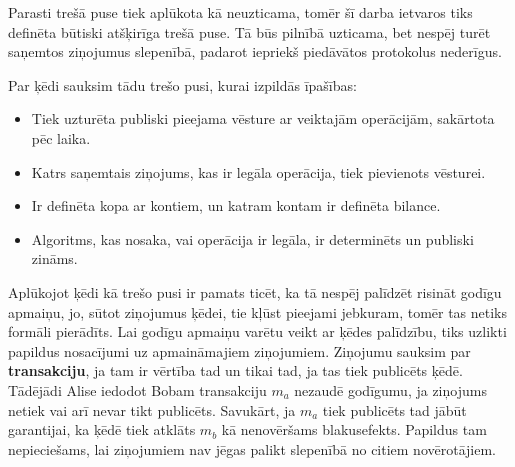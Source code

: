 Parasti trešā puse tiek aplūkota kā neuzticama, tomēr šī darba ietvaros tiks definēta būtiski atšķirīga trešā puse. Tā būs pilnībā uzticama, bet nespēj turēt saņemtos ziņojumus slepenībā, padarot iepriekš piedāvātos protokolus nederīgus.

Par ķēdi sauksim tādu trešo pusi, kurai izpildās īpašības:
\begin{itemize}
    \item Tiek uzturēta publiski pieejama vēsture ar veiktajām operācijām, sakārtota pēc laika.
    \item Katrs saņemtais ziņojums, kas ir legāla operācija, tiek pievienots vēsturei.
    \item Ir definēta kopa ar kontiem, un katram kontam ir definēta bilance.
    \item Algoritms, kas nosaka, vai operācija ir legāla, ir determinēts un publiski zināms.
\end{itemize}

Aplūkojot ķēdi kā trešo pusi ir pamats ticēt, ka tā nespēj palīdzēt risināt godīgu apmaiņu, jo, sūtot ziņojumus ķēdei, tie kļūst pieejami jebkuram, tomēr tas netiks formāli pierādīts. Lai godīgu apmaiņu varētu veikt ar ķēdes palīdzību, tiks uzlikti papildus nosacījumi uz apmaināmajiem ziņojumiem. 
Ziņojumu sauksim par \textbf{transakciju}, ja tam ir vērtība tad un tikai tad, ja tas tiek publicēts ķēdē. Tādējādi Alise iedodot Bobam transakciju $m_a$ nezaudē godīgumu, ja ziņojums netiek vai arī nevar tikt publicēts. Savukārt, ja $m_a$ tiek publicēts tad jābūt garantijai, ka ķēdē tiek atklāts $m_b$ kā nenovēršams blakusefekts. Papildus tam nepieciešams, lai ziņojumiem nav jēgas palikt slepenībā no citiem novērotājiem.
